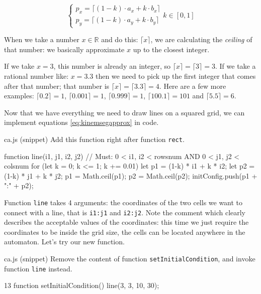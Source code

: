\begin{equation}
\label{eq:kinemsegapprox}
\begin{cases}
p_x = \lceil (1-k) \cdot a_x + k \cdot b_x \rceil\\
p_y = \lceil (1-k) \cdot a_y + k \cdot b_y \rceil
\end{cases}
k \in [0,1]
\end{equation}

When we take a number $x \in \mathbb{R}$ and do this: $\lceil x \rceil$, we are calculating
the \textit{ceiling} of that number: we basically approximate $x$ up to the closest integer.

\begin{example}
If we take $x = 3$, this number is already an integer, so $\lceil x \rceil = \lceil 3 \rceil = 3$.
If we take a rational number like: $x = 3.3$ then we need to pick up the first integer that
comes after that number; that number is $\lceil x \rceil = \lceil 3.3 \rceil = 4$.
Here are a few more examples: $\lceil 0.2 \rceil = 1$, $\lceil 0.001 \rceil = 1$,
$\lceil 0.999 \rceil = 1$, $\lceil 100.1 \rceil = 101$ and $\lceil 5.5 \rceil = 6$.
\end{example}

Now that we have everything we need to draw lines on a squared grid, we can implement
equations \ref{eq:kinemsegapprox} in code.

\begin{programcode}{ca.js (snippet)}
Add this function right after function \texttt{rect}.
\begin{code}
function line(i1, j1, i2, j2) {
  // Must: 0 < i1, i2 < rowsnum AND 0 < j1, j2 < colsnum
  for (let k = 0; k <= 1; k += 0.01) {
    let p1 = (1-k) * i1 + k * i2;
    let p2 = (1-k) * j1 + k * j2;
    p1 = Math.ceil(p1);
    p2 = Math.ceil(p2);
    initConfig.push(p1 + ":" + p2);
  }
}
\end{code}
\end{programcode}

Function \texttt{line} takes 4 arguments: the coordinates of the two cells we want to connect
with a line, that is \texttt{i1:j1} and \texttt{i2:j2}. Note the comment which clearly
describes the acceptable values of the coordinates: this time we just require the coordinates
to be inside the grid size, the cells can be located anywhere in the automaton. Let's try our
new function.

\begin{programcode}{ca.js (snippet)}
Remove the content of function \texttt{setInitialCondition}, and invoke function \texttt{line}
instead.
\begin{codeh1}{1}{3}
function setInitialCondition() {
  line(3, 3, 10, 30);
}
\end{codeh1}
\end{programcode}


